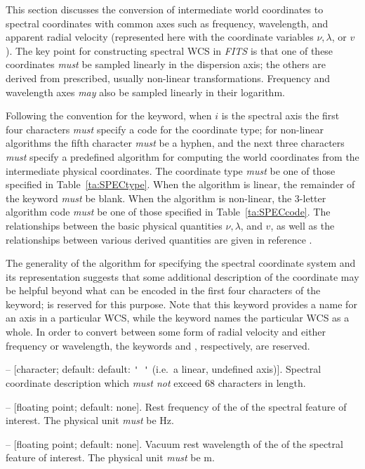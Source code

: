 \documentclass[onecolumn]{aa}
\begin{document}
This section discusses the conversion of intermediate world coordinates to
spectral coordinates with common axes such as frequency, wavelength, and apparent
radial velocity (represented here with the coordinate variables $\nu, \lambda$, or
$v$). The key point for constructing spectral WCS in {\em FITS\/} is that one of these
coordinates {\em must} be sampled linearly in the dispersion axis; the others are
derived from prescribed, usually non-linear transformations. Frequency and
wavelength axes {\em may} also be sampled linearly in their logarithm. 

Following the convention for the  keyword, when $i$ is the
spectral axis the first four characters {\em must} specify a code for the
coordinate type; for non-linear algorithms the fifth character {\em must} be a
hyphen, and the next three characters {\em must} specify a predefined algorithm
for computing the world coordinates from the intermediate physical coordinates.
The coordinate type {\em must} be one of those specified in Table~\ref{ta:SPECtype}. When the
algorithm is linear, the remainder of the  keyword
{\em must} be blank. When the algorithm is non-linear, the 3-letter algorithm
code {\em must} be one of those specified in Table~\ref{ta:SPECcode}. The relationships
between the basic physical quantities $\nu, \lambda$, and $v$, as well as the
relationships between various derived quantities are given in reference \cite{greisen06}. 

The generality of the algorithm for specifying the spectral coordinate system and
its representation suggests that some additional description of the coordinate may
be helpful beyond what can be encoded in the first four characters of the
 keyword;  is reserved for this purpose.
Note that this keyword provides a name for an axis in a particular WCS, while the
 keyword names the particular WCS as a whole. In order to convert
between some form of radial velocity and either frequency or wavelength, the
keywords  and , respectively, are reserved. 

\begin{description}

\item {}  -- [character; default: default: {\verb*+' '+}
(i.e.\ a linear, undefined axis)]. 
Spectral coordinate description which
{\em must not} exceed 68 characters in length. 

\item {}  -- [floating point; default: none]. 
Rest frequency of
the of the spectral feature of interest. The physical unit {\em must} be Hz.

\item {}  -- [floating point; default: none]. 
Vacuum rest
wavelength of the of the spectral feature of interest. The physical unit
{\em must} be m.

\end{description}
\end{document}
